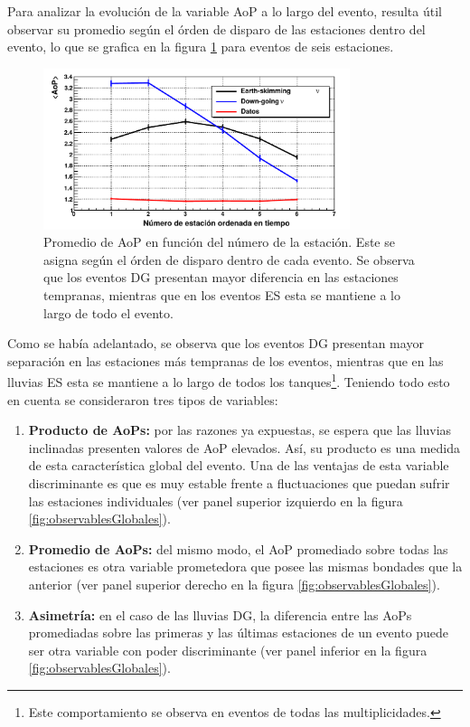 	Para analizar la evolución de la variable AoP a lo largo del evento, resulta útil observar su promedio según el órden de disparo de las estaciones dentro del evento, lo que se grafica en la figura \ref{fig:aop_vs_NStation} para eventos de seis estaciones.
	\begin{figure}[ht!]
		\begin{center}
		\includegraphics[width=0.8\textwidth]{fig/seleccionAuger/aop_vs_NStation}
		\caption{Promedio de AoP en función del número de la estación. Este se asigna según el órden de disparo dentro de cada evento. Se observa que los eventos DG presentan mayor diferencia en las estaciones tempranas, mientras que en los eventos ES esta se mantiene a lo largo de todo el evento.}
		\label{fig:aop_vs_NStation}
		\end{center}
	\end{figure}
	Como se hab\'ia adelantado, se observa que los eventos DG presentan mayor separación en las estaciones más tempranas de los eventos, mientras que en las lluvias ES esta se mantiene a lo largo de todos los tanques\footnote{Este comportamiento se observa en eventos de todas las multiplicidades.}. 	
	Teniendo todo esto en cuenta se consideraron tres tipos de variables:
	\begin{enumerate}
	 \item \textbf{Producto de AoPs:} por las razones ya expuestas, se espera que las lluvias inclinadas presenten valores de AoP elevados. Así, su producto es una medida de esta característica global del evento. Una de las ventajas de esta variable discriminante es que es muy estable frente a fluctuaciones que puedan sufrir las estaciones individuales (ver panel superior izquierdo en la figura \ref{fig:observablesGlobales}). 
	 \item \textbf{Promedio de AoPs:} del mismo modo, el AoP promediado sobre todas las estaciones es otra variable prometedora que posee las mismas bondades que la anterior (ver panel superior derecho en la figura \ref{fig:observablesGlobales}).
	 \item \textbf{Asimetría:} en el caso de las lluvias DG, la diferencia entre las AoPs promediadas sobre las primeras  y las últimas estaciones de un evento puede ser otra variable con poder discriminante (ver panel inferior en la figura \ref{fig:observablesGlobales}). 
	\end{enumerate}

